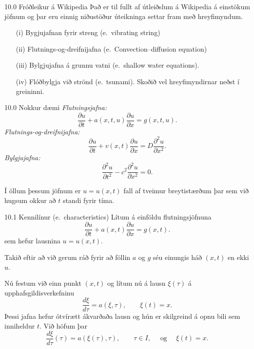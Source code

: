 \begin{frame}{10.0 Fróðleikur á Wikipedia} 
Það er til fullt af útleiðslum á Wikipedia á einstökum jöfnum og þar
eru einnig  niðustöður úteikninga settar fram með hreyfimyndum.

  \begin{enumerate}
  \item[(i)] Bygjujafnan fyrir streng (e.~vibrating string)
  \item[(ii)] Flutnings-og-dreifnijafna (e.~Convection–diffusion
    equation) 
  \item[(iii)] Bylgjujafna á grunnu vatni
(e.~shallow water equations).
  \item[(iv)]  Flóðbylgja við strönd (e.~tsunami).  Skoðið vel
    hreyfimyndirnar neðst í greininni. 
  \end{enumerate}
\end{frame}


\begin{frame}{10.0 Nokkur dæmi} 
{\it Flutningsjafna:}
$$
\dfrac{\partial u}{\partial t}
+a(x,t,u)\dfrac{\partial u}{\partial x}=g(x,t,u).
$$
{\it Flutnings-og-dreifnijafna:}
$$
\dfrac{\partial u}{\partial t}
+v(x,t)\dfrac{\partial u}{\partial x}=D
\dfrac{\partial^2 u}{\partial x^2}.
$$
{\it Bylgjujafna:}
$$
\dfrac{\partial^2 u}{\partial t^2}
-c^2\dfrac{\partial^2 u}{\partial x^2}=0.
$$

Í öllum þessum jöfnum er $u=u(x,t)$ fall af tveimur breytistærðum 
þar sem við hugsum okkur að $t$ standi fyrir tíma.
\end{frame}


\begin{frame}{10.1 Kennilínur (e.~characteristics)} 
Lítum á einföldu flutningsjöfnuna 
$$
\dfrac{\partial u}{\partial t}
+a(x,t)\dfrac{\partial u}{\partial x}=g(x,t).
$$
sem hefur lausnina $u=u(x,t)$.  

\smallskip 
Takið eftir að við gerum ráð fyrir að föllin $a$ og $g$ séu 
einungis háð  $(x,t)$ en ekki $u$. 

\smallskip
Nú festum við einn punkt $(x,t)$ og 
lítum nú á lausn $\xi(\tau)$ á upphafsgildisverkefninu
$$
  \dfrac{d\xi}{d\tau}=a(\xi,\tau), \qquad \xi(t)=x.
$$
Þessi jafna hefur ótvírætt ákvarðaða lausn og hún er skilgreind 
á opnu bili sem inniheldur $t$.  Við höfum þar
$$
\dfrac{d\xi}{d\tau}(\tau)= a(\xi(\tau),\tau), \qquad \tau \in I,
\quad \text{ og } \quad \xi(t)=x.
$$
\end{frame}


